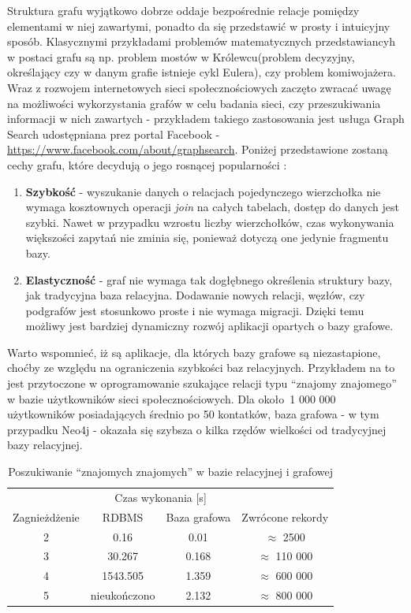 Struktura grafu wyjątkowo dobrze oddaje bezpośrednie relacje pomiędzy elementami w niej zawartymi, ponadto da się przedstawić w prosty i intuicyjny 
sposób. Klasycznymi przykładami problemów matematycznych przedstawiancyh w postaci grafu są np. problem mostów w Królewcu(problem decyzyjny, określający
czy w danym grafie istnieje cykl Eulera), czy problem komiwojażera. Wraz z rozwojem internetowych sieci społecznościowych zaczęto zwracać uwagę na 
możliwości wykorzystania grafów w celu badania sieci, czy przeszukiwania informacji w nich zawartych - przykładem takiego zastosowania jest 
usługa Graph Search udostępniana prez portal Facebook -\url{https://www.facebook.com/about/graphsearch}. Poniżej przedstawione zostaną cechy grafu,
które decydują o jego rosnącej popularności \cite{graphDb}:
\begin{enumerate}
    \item \textbf{Szybkość} - wyszukanie danych o relacjach pojedynczego wierzchołka nie wymaga kosztownych operacji \emph{join} na całych tabelach,
    dostęp do danych jest szybki. Nawet w przypadku wzrostu liczby wierzchołków, czas wykonywania większości zapytań nie zminia się, ponieważ dotyczą
    one jedynie fragmentu bazy.
    \item \textbf{Elastyczność} - graf nie wymaga tak dogłębnego określenia struktury bazy, jak tradycyjna baza relacyjna. Dodawanie nowych relacji, 
    węzłów, czy podgrafów jest stosunkowo proste i nie wymaga migracji. Dzięki temu możliwy jest bardziej dynamiczny rozwój aplikacji opartych o bazy grafowe.
\end{enumerate}

Warto wspomnieć, iż są aplikacje, dla których bazy grafowe są niezastapione, choćby ze względu na ograniczenia szybkości baz relacyjnych. Przykładem na to jest
przytoczone w \cite{neo4jAction} oprogramowanie szukające relacji typu ``znajomy znajomego'' w bazie użytkowników sieci społecznościowych. Dla około~1 000 000
użytkowników posiadających średnio po 50 kontatków, baza grafowa - w tym przypadku Neo4j - okazała się szybsza o kilka rzędów wielkości od tradycyjnej bazy
relacyjnej.

\begin{table}[h!]
\centering
\label{tabela:neo4jAwesome}
\caption{Poszukiwanie ``znajomych znajomych'' w bazie relacyjnej i grafowej}
\begin{tabular}{cccc}
\hline
&  \multicolumn{2}{c}{Czas wykonania [s]} &\\
\cline{2-3}
Zagnieżdżenie & RDBMS & Baza grafowa & Zwrócone rekordy\\
\hline
2 & 0.16 & 0.01 & \(\approx\) 2500 \\
3 & 30.267 & 0.168 & \(\approx\) 110 000\\
4 & 1543.505 & 1.359 & \(\approx\) 600 000\\
5 & nieukończono & 2.132 & \(\approx\) 800 000\\ 
\hline
\end{tabular}
\end{table}



